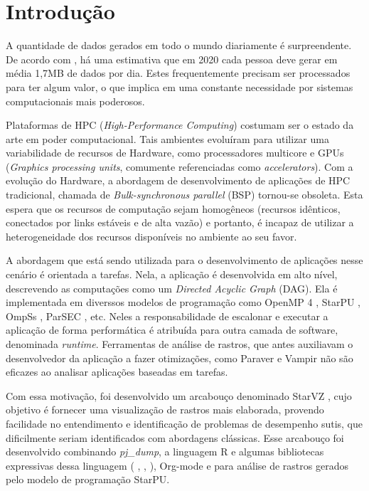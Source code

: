 \chapter{Introdução} \label{ch:intro}

A quantidade de dados gerados em todo o mundo diariamente é surpreendente. De 
acordo com \citet{ref:data_minute2}, há uma estimativa que em 2020 cada pessoa 
deve gerar em média 1,7MB de dados por dia. Estes frequentemente precisam ser 
processados para ter algum valor, o que implica em uma constante necessidade por 
sistemas computacionais mais poderosos.

Plataformas de HPC (\textit{High-Performance Computing}) costumam ser o estado 
da arte em poder computacional. Tais ambientes evoluíram para utilizar 
uma variabilidade de recursos de Hardware, como processadores multicore e GPUs 
(\textit{Graphics processing units}, comumente referenciadas como 
\textit{accelerators}). Com a evolução do Hardware, a abordagem de 
desenvolvimento de aplicações de HPC tradicional, chamada de 
\textit{Bulk-synchronous parallel} (BSP) tornou-se obsoleta. Esta espera que os 
recursos de computação sejam homogêneos (recursos idênticos, conectados por 
links estáveis e de alta vazão) e portanto, é incapaz de utilizar a 
heterogeneidade dos recursos disponíveis no ambiente ao seu favor. 

A abordagem que está sendo utilizada para o desenvolvimento de aplicações nesse 
cenário é orientada a tarefas. Nela, a aplicação é desenvolvida em alto nível, 
descrevendo as computações como um \textit{Directed Acyclic Graph} (DAG). Ela é 
implementada em diverssos modelos de programação como OpenMP 4 
\cite{ref:openmp4}, StarPU \cite{ref:starpu}, OmpSs \cite{ref:ompss}, 
ParSEC \cite{ref:parsec}, etc. Neles a responsabilidade de 
escalonar e executar a aplicação de forma performática é atribuída para outra 
camada de software, denominada \textit{runtime}. Ferramentas de análise de 
rastros, que antes auxiliavam o desenvolvedor da aplicação a fazer 
otimizações, como Paraver \cite{ref:paraver} e Vampir \cite{ref:vampir} não são 
eficazes ao analisar aplicações baseadas em tarefas.

Com essa motivação, foi desenvolvido um arcabouço denominado StarVZ 
\cite{ref:starvz}, cujo objetivo é fornecer uma visualização de rastros mais 
elaborada, provendo facilidade no entendimento e identificação de problemas de 
desempenho sutis, que dificilmente seriam identificados com abordagens 
clássicas. Esse arcabouço foi desenvolvido combinando \textit{pj\_dump},  
a linguagem R \cite{ref:rlanguage} e algumas bibliotecas expressivas dessa 
linguagem ( \cite{ref:ggplot2},  
\cite{ref:lpsolve},  \cite{ref:tidyverse}), Org-mode 
\cite{ref:org-mode} e  para análise de rastros gerados pelo 
modelo de programação StarPU.

